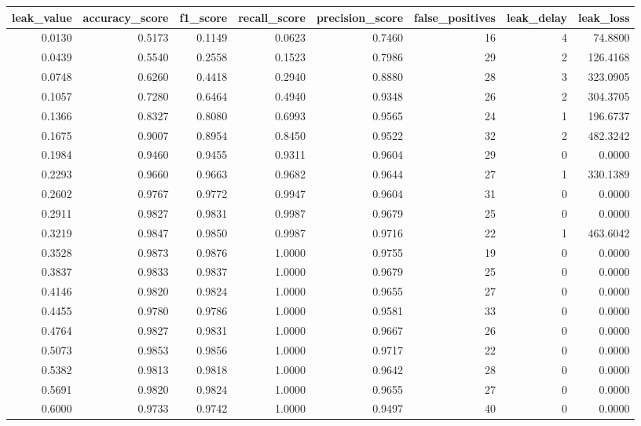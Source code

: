 \begin{tabular}{rrrrrrrr}
\toprule
leak\_value & accuracy\_score & f1\_score & recall\_score & precision\_score & false\_positives & leak\_delay & leak\_loss \\
\midrule
0.0130 & 0.5173 & 0.1149 & 0.0623 & 0.7460 & 16 & 4 & 74.8800 \\
0.0439 & 0.5540 & 0.2558 & 0.1523 & 0.7986 & 29 & 2 & 126.4168 \\
0.0748 & 0.6260 & 0.4418 & 0.2940 & 0.8880 & 28 & 3 & 323.0905 \\
0.1057 & 0.7280 & 0.6464 & 0.4940 & 0.9348 & 26 & 2 & 304.3705 \\
0.1366 & 0.8327 & 0.8080 & 0.6993 & 0.9565 & 24 & 1 & 196.6737 \\
0.1675 & 0.9007 & 0.8954 & 0.8450 & 0.9522 & 32 & 2 & 482.3242 \\
0.1984 & 0.9460 & 0.9455 & 0.9311 & 0.9604 & 29 & 0 & 0.0000 \\
0.2293 & 0.9660 & 0.9663 & 0.9682 & 0.9644 & 27 & 1 & 330.1389 \\
0.2602 & 0.9767 & 0.9772 & 0.9947 & 0.9604 & 31 & 0 & 0.0000 \\
0.2911 & 0.9827 & 0.9831 & 0.9987 & 0.9679 & 25 & 0 & 0.0000 \\
0.3219 & 0.9847 & 0.9850 & 0.9987 & 0.9716 & 22 & 1 & 463.6042 \\
0.3528 & 0.9873 & 0.9876 & 1.0000 & 0.9755 & 19 & 0 & 0.0000 \\
0.3837 & 0.9833 & 0.9837 & 1.0000 & 0.9679 & 25 & 0 & 0.0000 \\
0.4146 & 0.9820 & 0.9824 & 1.0000 & 0.9655 & 27 & 0 & 0.0000 \\
0.4455 & 0.9780 & 0.9786 & 1.0000 & 0.9581 & 33 & 0 & 0.0000 \\
0.4764 & 0.9827 & 0.9831 & 1.0000 & 0.9667 & 26 & 0 & 0.0000 \\
0.5073 & 0.9853 & 0.9856 & 1.0000 & 0.9717 & 22 & 0 & 0.0000 \\
0.5382 & 0.9813 & 0.9818 & 1.0000 & 0.9642 & 28 & 0 & 0.0000 \\
0.5691 & 0.9820 & 0.9824 & 1.0000 & 0.9655 & 27 & 0 & 0.0000 \\
0.6000 & 0.9733 & 0.9742 & 1.0000 & 0.9497 & 40 & 0 & 0.0000 \\
\bottomrule
\end{tabular}
